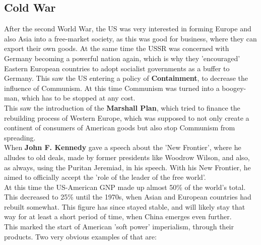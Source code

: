 \documentclass{article}
\begin{document}
	\subsection{Cold War}
	After the second World War, the US was very interested in forming Europe and also Asia into a free-market society, as this was good for business, where they can export their own goods. At the same time the USSR was concerned with Germany becoming a powerful nation again, which is why they 'encouraged' Eastern European countries to adopt socialist governments as a buffer to Germany. This saw the US entering a policy of \textbf{Containment}, to decrease the influence of Communism. At this time Communism was turned into a boogey-man, which has to be stopped at any cost. \\
	This saw the introduction of the \textbf{Marshall Plan}, which tried to finance the rebuilding process of Western Europe, which was supposed to not only create a continent of consumers of American goods but also stop Communism from spreading. \\
	When \textbf{John F. Kennedy} gave a speech about the 'New Frontier', where he alludes to old deals, made by former presidents like Woodrow Wilson, and also, as always, using the Puritan Jeremiad, in his speech. With his New Frontier, he aimed to officially accept the 'role of the leader of the free world'. \\
	At this time the US-American GNP made up almost 50\% of the world's total. This decreased to 25\% until the 1970s, when Asian and European countries had rebuilt somewhat. This figure has since stayed stable, and will likely stay that way for at least a short period of time, when China emerges even further. \\
	This marked the start of American 'soft power' imperialism, through their products. Two very obvious examples of that are:
\end{document}
